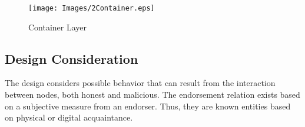 \begin{figure}
	\texttt{[image: Images/2Container.eps]}
	\caption{Container Layer}
	\label{fig:SystemContainer}
\end{figure}

%

\subsection{Design Consideration} \label{subsec:design_considerations}
The design considers possible behavior that can result from the interaction
between nodes, both honest and malicious. The endorsement relation exists based
on a subjective measure from an endorser. Thus, they are known entities based
on physical or digital acquaintance.\\

